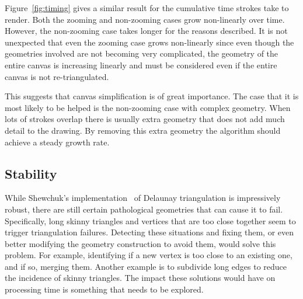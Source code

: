 \documentclass[conference]{acmsiggraph}
\begin{document}
Figure~\ref{fig:timing} gives a similar result for the cumulative time strokes take to render. Both
the zooming and non-zooming cases grow non-linearly over time. However, the non-zooming case takes
longer for the reasons described. 
It is not unexpected that even the zooming case grows non-linearly
since even though the geometries involved are not becoming very complicated, the geometry of the entire
canvas is increasing linearly and must be considered even if the entire canvas is not re-triangulated. 


This suggests that canvas simplification is of great importance.
The case that it is most likely to be helped is the non-zooming case with complex geometry. When lots of strokes
overlap there is usually extra geometry that does not add much detail to the drawing. By removing
this extra geometry the algorithm should achieve a steady growth rate.


\subsection{Stability} 

While Shewchuk's implementation~ of Delaunay triangulation is impressively robust, there are still certain pathological geometries that can cause it to fail.  Specifically, long skinny triangles and vertices that are too close together seem to trigger triangulation failures.  Detecting these situations and fixing them, or even better modifying the geometry construction to avoid them, would solve this problem.  For example, identifying if a new vertex is too close to an existing one, and if so, merging them.  Another example is to subdivide long edges to reduce the incidence of skinny triangles.  The impact these solutions would have on processing time is something that needs to be explored.
\end{document}
